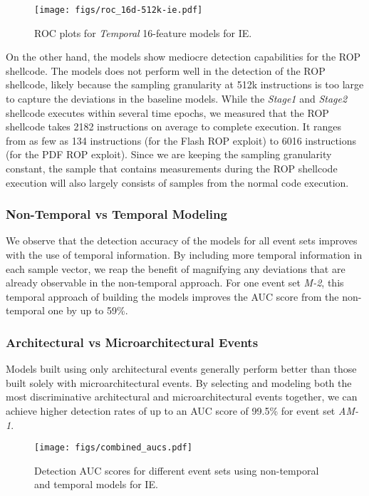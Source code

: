 \documentclass{acm_proc_article-sp}
\begin{document}
\begin{figure}
  \centering
  \texttt{[image: figs/roc\_16d-512k-ie.pdf]}
  \caption{ROC plots for \emph{Temporal} 16-feature models for IE.}
  \label{fig:roc_16d-512k-ie}
\end{figure}

On the other hand, the models show mediocre detection capabilities for the ROP shellcode. The models does not perform well in the detection of the ROP shellcode, likely because the sampling granularity at 512k instructions is too large to capture the deviations in the baseline models. While the \textit{Stage1} and \textit{Stage2} shellcode executes within several time epochs, we measured that the ROP shellcode takes 2182 instructions on average to complete execution. It ranges from as few as 134 instructions (for the Flash ROP exploit) to 6016 instructions (for the PDF ROP exploit). Since we are keeping the sampling granularity constant, the sample that contains measurements during the ROP shellcode execution will also largely consists of samples from the normal code execution.




\subsubsection{Non-Temporal vs Temporal Modeling}
We observe that the detection accuracy of the models for all event sets improves with the use of temporal information. By including more temporal information in each sample vector, we reap the benefit of magnifying any deviations that are already observable in the non-temporal approach. For one event set \textit{M-2}, this temporal approach of building the models improves the AUC score from the non-temporal one by up to 59\%.

\subsubsection{Architectural vs Microarchitectural Events}
Models built using only architectural events generally perform better than those built solely with microarchitectural events. By selecting and modeling both the most discriminative architectural and microarchitectural events together, we can achieve higher detection rates of up to an AUC score of 99.5\% for event set \textit{AM-1}.


\begin{figure}
  \centering
  \texttt{[image: figs/combined\_aucs.pdf]}
  \caption{Detection AUC scores for different event sets using non-temporal and temporal models for IE.}
  \label{fig:combined_aucs}
\end{figure}
\end{document}
